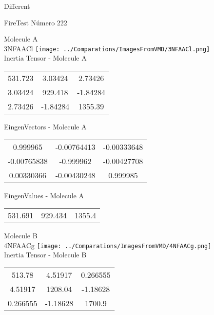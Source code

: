 \begin{center}
\vtab
\vtab
\textcolor{NavyBlue}{\Large Different}
\end{center}

 \newpage

\vtab[-2cm]
\begin{center}
{\large FireTest \tab Número 222}
\end{center}
\begin{multicols}{2}
\begin{center}

Molecule A \\ 
3NFAACl
\texttt{[image: ../Comparations/ImagesFromVMD/3NFAACl.png]}
\\
Inertia Tensor - Molecule A \\
\vtab

\begin{tabular}{|c c c|}
531.723	 & 	3.03424	 & 	2.73426	 \\
3.03424	 & 	929.418	 & 	-1.84284	 \\
2.73426	 & 	-1.84284	 & 	1355.39
\end{tabular}

\vtab
 EingenVectors - Molecule A     \\
\vtab
\begin{tabular}{|c c c|}
0.999965	 & 	-0.00764413	 & 	-0.00333648	 \\
-0.00765838	 & 	-0.999962	 & 	-0.00427708	 \\
0.00330366	 & 	-0.00430248	 & 	0.999985
\end{tabular}

\vtab
 EingenValues - Molecule A     \\
\vtab
\begin{tabular}{|c c c|}
531.691	 & 	929.434	 & 	1355.4	 \\
\end{tabular}
\columnbreak

Molecule B \\ 
4NFAACg
\texttt{[image: ../Comparations/ImagesFromVMD/4NFAACg.png]}
\\
Inertia Tensor - Molecule B \\
\vtab

\begin{tabular}{|c c c|}
513.78	 & 	4.51917	 & 	0.266555	 \\
4.51917	 & 	1208.04	 & 	-1.18628	 \\
0.266555	 & 	-1.18628	 & 	1700.9
\end{tabular}


\end{center}
\end{multicols}
